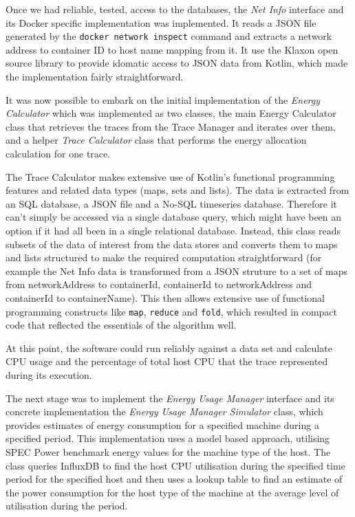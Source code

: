 Once we had reliable, tested, access to the databases, the \emph{Net Info} interface and its Docker specific implementation was implemented.  It reads a JSON file generated by the \texttt{docker network inspect} command and extracts a network address to container ID to host name mapping from it.  It use the Klaxon open source library to provide idomatic access to JSON data from Kotlin, which made the implementation fairly straightforward.

It was now possible to embark on the initial implementation of the \emph{Energy Calculator} which was implemented as two classes, the main Energy Calculator class that retrieves the traces from the Trace Manager and iterates over them, and a helper \emph{Trace Calculator} class that performs the energy allocation calculation for one trace.

The Trace Calculator makes extensive use of Kotlin's functional programming features and related data types (maps, sets and lists).  The data is extracted from an SQL database, a JSON file and a No-SQL timeseries database.  Therefore it can't simply be accessed via a single database query, which might have been an option if it had all been in a single relational database.  Instead, this class reads subsets of the data of interest from the data stores and converts them to maps and lists structured to make the required computation straightforward (for example the Net Info data is transformed from a JSON struture to a set of maps from networkAddress to containerId, containerId to networkAddress and containerId to containerName).  This then allows extensive use of functional programming constructs like \texttt{map}, \texttt{reduce} and \texttt{fold}, which resulted in compact code that reflected the essentials of the algorithm well.

At this point, the software could run reliably against a data set and calculate CPU usage and the percentage of total host CPU that the trace represented during its execution.

The next stage was to implement the \emph{Energy Usage Manager} interface and its concrete implementation the \emph{Energy Usage Manager Simulator} class, which provides estimates of energy consumption for a specified machine during a specified period.  This implementation uses a model based approach, utilising SPEC Power benchmark energy values for the machine type of the host.  The class queries InfluxDB to find the host CPU utilisation during the specified time period for the specified host and then uses a lookup table to find an estimate of the power consumption for the host type of the machine at the average level of utilisation during the period.

